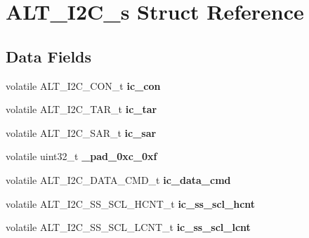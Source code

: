 \hypertarget{structALT__I2C__s}{}\section{A\+L\+T\+\_\+\+I2\+C\+\_\+s Struct Reference}
\label{structALT__I2C__s}
\subsection*{Data Fields}
\begin{DoxyCompactItemize}
\item 
\mbox{\label{structALT__I2C__s_a0925e8434c67eb66dc11b01925127a10}} 
volatile A\+L\+T\+\_\+\+I2\+C\+\_\+\+C\+O\+N\+\_\+t {\bfseries ic\+\_\+con}
\item 
\mbox{\label{structALT__I2C__s_ac4478915696ebdcce440bbeaee9ed0f0}} 
volatile A\+L\+T\+\_\+\+I2\+C\+\_\+\+T\+A\+R\+\_\+t {\bfseries ic\+\_\+tar}
\item 
\mbox{\label{structALT__I2C__s_a5d0fba459cd482b6da313cebd6058290}} 
volatile A\+L\+T\+\_\+\+I2\+C\+\_\+\+S\+A\+R\+\_\+t {\bfseries ic\+\_\+sar}
\item 
\mbox{\label{structALT__I2C__s_acf816ab1996e3493822b7e76d56ae295}} 
volatile uint32\+\_\+t {\bfseries \+\_\+pad\+\_\+0xc\+\_\+0xf}
\item 
\mbox{\label{structALT__I2C__s_adece67c044b0de8f37e576a0f701853d}} 
volatile A\+L\+T\+\_\+\+I2\+C\+\_\+\+D\+A\+T\+A\+\_\+\+C\+M\+D\+\_\+t {\bfseries ic\+\_\+data\+\_\+cmd}
\item 
\mbox{\label{structALT__I2C__s_aeccea66b0191c06f76e253d2043b212c}} 
volatile A\+L\+T\+\_\+\+I2\+C\+\_\+\+S\+S\+\_\+\+S\+C\+L\+\_\+\+H\+C\+N\+T\+\_\+t {\bfseries ic\+\_\+ss\+\_\+scl\+\_\+hcnt}
\item 
\mbox{\label{structALT__I2C__s_acf48680e0eaa8f46a808e80db7cd527b}} 
volatile A\+L\+T\+\_\+\+I2\+C\+\_\+\+S\+S\+\_\+\+S\+C\+L\+\_\+\+L\+C\+N\+T\+\_\+t {\bfseries ic\+\_\+ss\+\_\+scl\+\_\+lcnt}
\item 
\mbox{\label{structALT__I2C__s_a6df5010c27cb33eb1c3d31d3cadd0a31}} 

\end{DoxyCompactItemize}
